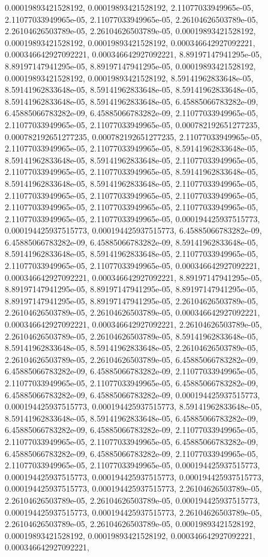 \documentclass[
  ,man]{apa6}
\begin{document}
0.00019893421528192, 0.00019893421528192, 2.11077033949965e-05, 2.11077033949965e-05, 2.11077033949965e-05, 2.26104626503789e-05, 2.26104626503789e-05, 2.26104626503789e-05, 0.00019893421528192, 0.00019893421528192, 0.00019893421528192, 0.000346642927092221, 0.000346642927092221, 0.000346642927092221, 8.89197147941295e-05, 8.89197147941295e-05, 8.89197147941295e-05, 0.00019893421528192, 0.00019893421528192, 0.00019893421528192, 8.59141962833648e-05, 8.59141962833648e-05, 8.59141962833648e-05, 8.59141962833648e-05,
8.59141962833648e-05, 8.59141962833648e-05, 6.45885066783282e-09, 6.45885066783282e-09, 6.45885066783282e-09, 2.11077033949965e-05, 2.11077033949965e-05, 2.11077033949965e-05, 0.000782192651277235, 0.000782192651277235, 0.000782192651277235, 2.11077033949965e-05, 2.11077033949965e-05, 2.11077033949965e-05, 8.59141962833648e-05, 8.59141962833648e-05, 8.59141962833648e-05, 2.11077033949965e-05, 2.11077033949965e-05, 2.11077033949965e-05, 8.59141962833648e-05, 8.59141962833648e-05, 8.59141962833648e-05,
2.11077033949965e-05, 2.11077033949965e-05, 2.11077033949965e-05, 2.11077033949965e-05, 2.11077033949965e-05, 2.11077033949965e-05, 2.11077033949965e-05, 2.11077033949965e-05, 2.11077033949965e-05, 0.000194425937515773, 0.000194425937515773, 0.000194425937515773, 6.45885066783282e-09, 6.45885066783282e-09, 6.45885066783282e-09, 8.59141962833648e-05, 8.59141962833648e-05, 8.59141962833648e-05, 2.11077033949965e-05, 2.11077033949965e-05, 2.11077033949965e-05, 0.000346642927092221, 0.000346642927092221,
0.000346642927092221, 8.89197147941295e-05, 8.89197147941295e-05, 8.89197147941295e-05, 8.89197147941295e-05, 8.89197147941295e-05, 8.89197147941295e-05, 2.26104626503789e-05, 2.26104626503789e-05, 2.26104626503789e-05, 0.000346642927092221, 0.000346642927092221, 0.000346642927092221, 2.26104626503789e-05, 2.26104626503789e-05, 2.26104626503789e-05, 8.59141962833648e-05, 8.59141962833648e-05, 8.59141962833648e-05, 2.26104626503789e-05, 2.26104626503789e-05, 2.26104626503789e-05, 6.45885066783282e-09,
6.45885066783282e-09, 6.45885066783282e-09, 2.11077033949965e-05, 2.11077033949965e-05, 2.11077033949965e-05, 6.45885066783282e-09, 6.45885066783282e-09, 6.45885066783282e-09, 0.000194425937515773, 0.000194425937515773, 0.000194425937515773, 8.59141962833648e-05, 8.59141962833648e-05, 8.59141962833648e-05, 6.45885066783282e-09, 6.45885066783282e-09, 6.45885066783282e-09, 2.11077033949965e-05, 2.11077033949965e-05, 2.11077033949965e-05, 6.45885066783282e-09, 6.45885066783282e-09, 6.45885066783282e-09,
2.11077033949965e-05, 2.11077033949965e-05, 2.11077033949965e-05, 0.000194425937515773, 0.000194425937515773, 0.000194425937515773, 0.000194425937515773, 0.000194425937515773, 0.000194425937515773, 2.26104626503789e-05, 2.26104626503789e-05, 2.26104626503789e-05, 0.000194425937515773, 0.000194425937515773, 0.000194425937515773, 2.26104626503789e-05, 2.26104626503789e-05, 2.26104626503789e-05, 0.00019893421528192, 0.00019893421528192, 0.00019893421528192, 0.000346642927092221, 0.000346642927092221,
\end{document}
